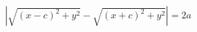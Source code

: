 \documentclass[preview]{standalone}
\begin{document}
\begin{align*}
|\sqrt{(x-c)^2+y^2} - \sqrt{(x+c)^2+y^2}| = 2a
\end{align*}
\end{document}
